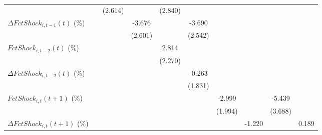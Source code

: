 {\begin{tabular}{l*{9}{c}}
                    &                     &     (2.614)         &                     &     (2.840)         &                     &                     &                     &                     &                     \\
\addlinespace
$ \Delta FctShock_{i,t-1}(t)$ (\%)&                     &                     &      -3.676         &                     &      -3.690         &                     &                     &                     &                     \\
                    &                     &                     &     (2.601)         &                     &     (2.542)         &                     &                     &                     &                     \\
\addlinespace
$ FctShock_{i,t-2}(t)$ (\%)&                     &                     &                     &       2.814         &                     &                     &                     &                     &                     \\
                    &                     &                     &                     &     (2.270)         &                     &                     &                     &                     &                     \\
\addlinespace
$ \Delta FctShock_{i,t-2}(t)$ (\%)&                     &                     &                     &                     &      -0.263         &                     &                     &                     &                     \\
                    &                     &                     &                     &                     &     (1.831)         &                     &                     &                     &                     \\
\addlinespace
$ FctShock_{i,t}(t+1)$ (\%)&                     &                     &                     &                     &                     &      -2.999         &                     &      -5.439         &                     \\
                    &                     &                     &                     &                     &                     &     (1.994)         &                     &     (3.688)         &                     \\
\addlinespace
$ \Delta FctShock_{i,t}(t+1)$ (\%)&                     &                     &                     &                     &                     &                     &      -1.220         &                     &       0.189         \\

\end{tabular}}
